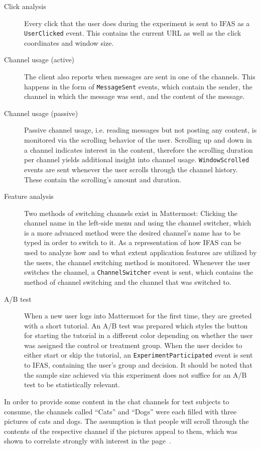 \begin{description}
\label{list:cases}
\item[Click analysis]
Every click that the user does during the experiment is sent to \ac{IFAS} as a \texttt{UserClicked} event.
This contains the current URL as well as the click coordinates and window size.
\item[Channel usage (active)]
The client also reports when messages are sent in one of the channels.
This happens in the form of \texttt{MessageSent} events, which contain the sender, the channel in which the message was sent, and the content of the message.
\item[Channel usage (passive)]
Passive channel usage, i.e. reading messages but not posting any content, is monitored via the scrolling behavior of the user.
Scrolling up and down in a channel indicates interest in the content, therefore the scrolling duration per channel yields additional insight into channel usage.
\texttt{WindowScrolled} events are sent whenever the user scrolls through the channel history.
These contain the scrolling's amount and duration.
\item[Feature analysis]
Two methods of switching channels exist in Mattermost: Clicking the channel name in the left-side menu and using the channel switcher, which is a more advanced method were the desired channel's name has to be typed in order to switch to it.
As a representation of how \ac{IFAS} can be used to analyze how and to what extent application features are utilized by the users, the channel switching method is monitored.
Whenever the user switches the channel, a \texttt{ChannelSwitcher} event is sent, which contains the method of channel switching and the channel that was switched to.
\item[A/B test]
When a new user logs into Mattermost for the first time, they are greeted with a short tutorial.
An A/B test was prepared which styles the button for starting the tutorial in a different color depending on whether the user was assigned the control or treatment group.
When the user decides to either start or skip the tutorial, an \texttt{ExperimentParticipated} event is sent to \ac{IFAS}, containing the user's group and decision.
It should be noted that the sample size achieved via this experiment does not suffice for an A/B test to be statistically relevant.

\end{description}

In order to provide some content in the chat channels for test subjects to consume, the channels called ``Cats'' and ``Dogs'' were each filled with three pictures of cats and dogs.
The assumption is that people will scroll through the contents of the respective channel if the pictures appeal to them, which was shown to correlate strongly with interest in the page~\cite{Claypool2001}.

